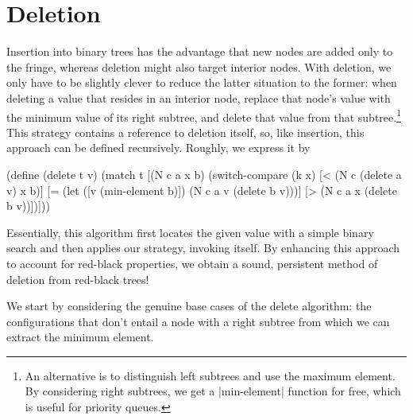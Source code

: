 \documentclass[preprint]{sigplanconf}
\begin{document}
\section{Deletion}

Insertion into binary trees has the advantage that new nodes are added only to the fringe, whereas deletion might also target interior nodes. With deletion, we only have to be slightly clever to reduce the latter situation to the former: when deleting a value that resides in an interior node, replace that node's value with the minimum value of its right subtree, and delete that value from that subtree.\footnote{An alternative is to distinguish left subtrees and use the maximum element. By considering right subtrees, we get a \scheme|min-element| function for free, which is useful for priority queues.} This strategy contains a reference to deletion itself, so, like insertion, this approach can be defined recursively. Roughly, we express it by
\begin{schemedisplay}
(define (delete t v)
  (match t
    [(N c a x b)
     (switch-compare
       (k x)
       [< (N c (delete a v) x b)]
       [= (let ([v (min-element b)])
            (N c a v (delete b v)))]
       [> (N c a x (delete b v))])]))
\end{schemedisplay}
Essentially, this algorithm first locates the given value with a simple binary search and then applies our strategy, invoking itself. By enhancing this approach to account for red-black properties, we obtain a sound, persistent method of deletion from red-black trees!

We start by considering the genuine base cases of the delete algorithm: the configurations that don't entail a node with a right subtree from which we can extract the minimum element.
\end{document}
